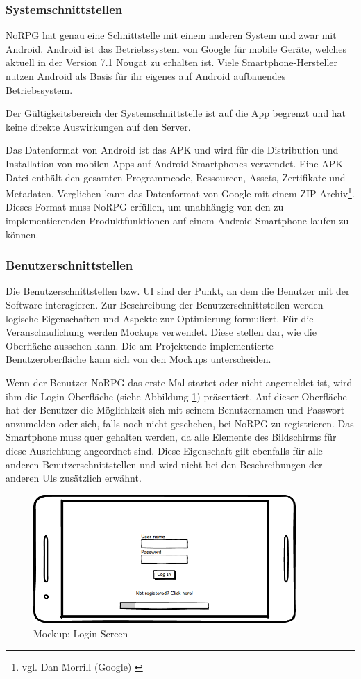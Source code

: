 		\subsubsection{Systemschnittstellen}
			NoRPG hat genau eine Schnittstelle mit einem anderen System und zwar mit Android. Android ist das Betriebssystem von Google für mobile Geräte, welches aktuell in der Version 7.1 Nougat zu erhalten ist. Viele Smartphone-Hersteller nutzen Android als Basis für ihr eigenes auf Android aufbauendes Betriebssystem. 
			
			Der Gültigkeitsbereich der Systemschnittstelle ist auf die App begrenzt und hat keine direkte Auswirkungen auf den Server. 
			
			Das Datenformat von Android ist das \ac{APK} und wird für die Distribution und Installation von mobilen Apps auf Android Smartphones verwendet. Eine \ac{APK}-Datei enthält den gesamten Programmcode, Ressourcen, Assets, Zertifikate und Metadaten. Verglichen kann das Datenformat von Google mit einem ZIP-Archiv\footnote{vgl. Dan Morrill (Google) \cite{google1}}. Dieses Format muss NoRPG erfüllen, um unabhängig von den zu implementierenden Produktfunktionen auf einem Android Smartphone laufen zu können.
			
		\subsubsection{Benutzerschnittstellen}
			Die Benutzerschnittstellen bzw. \ac{UI} sind der Punkt, an dem die Benutzer mit der Software interagieren. Zur Beschreibung der Benutzerschnittstellen werden logische Eigenschaften und Aspekte zur Optimierung formuliert. Für die Veranschaulichung werden Mockups verwendet. Diese stellen dar, wie die Oberfläche aussehen kann. Die am Projektende implementierte Benutzeroberfläche kann sich von den Mockups unterscheiden.
			
			Wenn der Benutzer NoRPG das erste Mal startet oder nicht angemeldet ist, wird ihm die Login-Oberfläche (siehe Abbildung \ref{mockupLogin}) präsentiert. Auf dieser Oberfläche hat der Benutzer die Möglichkeit sich mit seinem Benutzernamen und Passwort anzumelden oder sich, falls noch nicht geschehen, bei NoRPG zu registrieren. Das Smartphone muss quer gehalten werden, da alle Elemente des Bildschirms für diese Ausrichtung angeordnet sind. Diese Eigenschaft gilt ebenfalls für alle anderen Benutzerschnittstellen und wird nicht bei den Beschreibungen der anderen \acp{UI} zusätzlich erwähnt.  
			
			\begin{figure}[htbp]
				\centering 
				\label{mockupLogin}
				\includegraphics[width=10cm]{pics/Login.png}
				\caption{Mockup: Login-Screen}
			\end{figure}
			
